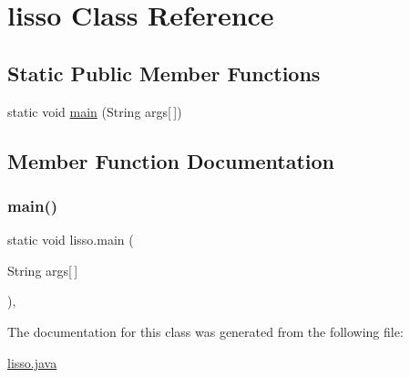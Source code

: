 \hypertarget{classlisso}{}\section{lisso Class Reference}
\label{classlisso}
\subsection*{Static Public Member Functions}
\begin{DoxyCompactItemize}
\item 
static void \hyperlink{classlisso_a474f3969e6cd975fa5341da6caca0047}{main} (String args\mbox{[}$\,$\mbox{]})
\end{DoxyCompactItemize}


\subsection{Member Function Documentation}
\mbox{\label{classlisso_a474f3969e6cd975fa5341da6caca0047}} 
\subsubsection{\texorpdfstring{main()}{main()}}
{\footnotesize\ttfamily static void lisso.\+main (\begin{DoxyParamCaption}\item[{String}]{args\mbox{[}$\,$\mbox{]} }\end{DoxyParamCaption})\hspace{0.3cm}{\ttfamily [inline]}, {\ttfamily [static]}}



The documentation for this class was generated from the following file\+:\begin{DoxyCompactItemize}
\item 
\hyperlink{lisso_8java}{lisso.\+java}\end{DoxyCompactItemize}
